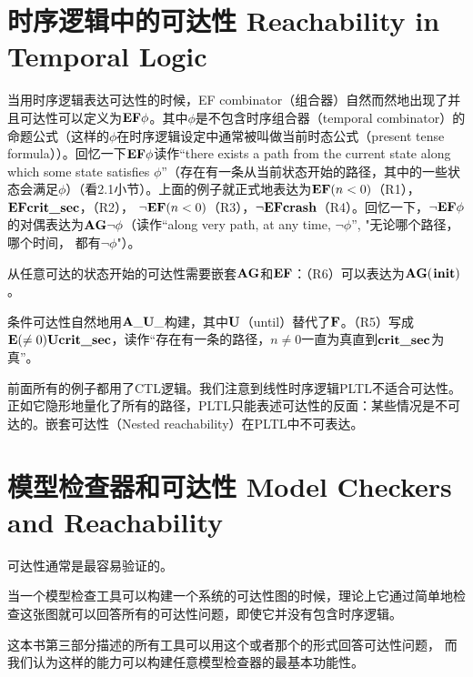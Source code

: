 \documentclass{book}
\begin{document}
    \section{时序逻辑中的可达性 Reachability in Temporal Logic}
    当用时序逻辑表达可达性的时候，EF combinator（组合器）自然而然地出现了并且可达性可以定义为$\text{\textbf{E}}\text{\textbf{F}}\phi$。其中$\phi$是不包含时序组合器（temporal combinator）的命题公式（这样的$\phi$在时序逻辑设定中通常被叫做当前时态公式（present tense formula））。回忆一下$\text{\textbf{E}}\text{\textbf{F}}\phi$读作“there exists a path from the current state along which some state satisfies $\phi$”（存在有一条从当前状态开始的路径，其中的一些状态会满足$\phi$）（看2.1小节）。上面的例子就正式地表达为$\text{\textbf{E}}\text{\textbf{F}}(n<0)$（R1），$\text{\textbf{E}} \text{\textbf{F}} \text{\textbf{crit\_sec}}$，（R2），
    $\neg\text{\textbf{E}}\text{\textbf{F}}(n<0)$（R3），$\neg\text{\textbf{E}}\text{\textbf{F}}\text{\textbf{crash}}$（R4）。回忆一下，$\neg\text{\textbf{E}}\text{\textbf{F}}\phi$的对偶表达为$\text{\textbf{A}}\text{\textbf{G}}\neg\phi$（读作“along very path, at any time, $\neg\phi$”, "无论哪个路径，哪个时间， 都有$\neg\phi$"）。

    从任意可达的状态开始的可达性需要嵌套$\text{\textbf{A}}\text{\textbf{G}}$和$\text{\textbf{E}}\text{\textbf{F}}$：（R6）可以表达为$\text{\textbf{A}}\text{\textbf{G}}($$\text{\textbf{init}})$。

    条件可达性自然地用$\text{\textbf{A}}\_\text{\textbf{U}}\_$构建，其中$\text{\textbf{U}}$（until）替代了$\text{\textbf{F}}$。（R5）写成$\text{\textbf{E}}(\neq 0)\text{\textbf{U}}\text{\textbf{crit\_sec}}$，读作“存在有一条的路径，$n\neq 0$一直为真直到$\text{\textbf{crit\_sec}}$为真”。

    前面所有的例子都用了CTL逻辑。我们注意到线性时序逻辑PLTL不适合可达性。正如它隐形地量化了所有的路径，PLTL只能表述可达性的反面：某些情况是不可达的。嵌套可达性（Nested reachability）在PLTL中不可表达。

    \section{模型检查器和可达性 Model Checkers and Reachability}
    可达性通常是最容易验证的。

    当一个模型检查工具可以构建一个系统的可达性图的时候，理论上它通过简单地检查这张图就可以回答所有的可达性问题，即使它并没有包含时序逻辑。

    这本书第三部分描述的所有工具可以用这个或者那个的形式回答可达性问题， 而我们认为这样的能力可以构建任意模型检查器的最基本功能性。
\end{document}
